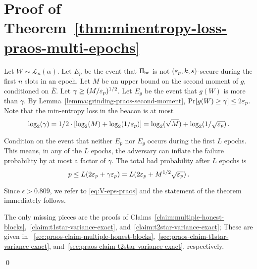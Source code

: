 \section{Proof of Theorem~\ref{thm:minentropy-loss-praos-multi-epochs}}\label{sec:thm-praos-multiepoch}\label{sec:proof-praos-theorem}

Let $W \sim \mathcal{L}_n(\alpha)$. 
Let $E_p$ be the event that 
$\Pi_\mathsf{bc}$ is not $(\mathsf{\varepsilon}_p, k, s)$-secure during 
the first $n$ slots in an epoch. 
Let $M$ be an upper bound on the second moment of $g$, 
conditioned on $\overline{E}$. 
Let $\gamma \geq (M/\mathsf{\varepsilon}_p)^{1/2}$. 
Let $E_g$ be the event that $g(W)$ is more than $\gamma$.
By Lemma~\ref{lemma:grinding-praos-second-moment}, 
$\Pr[g(W) \geq \gamma] \leq 2 \mathsf{\varepsilon}_p$. 
Note that the min-entropy loss in the beacon is at most 
\begin{equation}\label{eq:log-gamma}
 \log_2(\gamma) 
 = 1/2 \cdot [\log_2(M) + \log_2(1/\mathsf{\varepsilon}_p)]
 = \log_2(\sqrt{M}) + \log_2(1/\sqrt{\mathsf{\varepsilon}_p})
 \,. 
\end{equation}


Condition on the event that neither $E_p$ nor $E_g$ 
occurs during the first $L$ epochs. 
This means, in any of the $L$ epochs, 
the adversary can inflate the failure probability 
by at most a factor of $\gamma$.
The total bad probability after $L$ epochs is
$$
  p
  \leq L (2 \mathsf{\varepsilon}_p + \gamma \mathsf{\varepsilon}_p)
  = L (2 \mathsf{\varepsilon}_p + M^{1/2} \sqrt{\mathsf{\varepsilon}_p})
  \,.
$$

Since $\epsilon > 0.809$, we refer to \eqref{eq:V-eps-praos} 
and the statement of the theorem immediately follows.

The only missing pieces are 
the proofs of Claims~\ref{claim:multiple-honest-blocks},~\ref{claim:t1star-variance-exact}, 
and~\ref{claim:t2star-variance-exact}; 
These are given in \Section~\ref{sec:praos-claim-multiple-honest-blocks},~\ref{sec:praos-claim-t1star-variance-exact}, and~\ref{sec:praos-claim-t2star-variance-exact}, respectively. 

\hfill\qed




